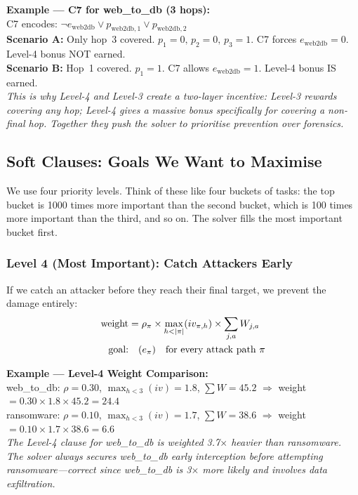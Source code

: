 \documentclass[journal]{IEEEtran}
\begin{document}
\begin{examplebox}
\textbf{Example --- C7 for web\_to\_db (3 hops):}\\[3pt]
C7 encodes:
$\neg e_{\text{web2db}} \vee p_{\text{web2db},1}
\vee p_{\text{web2db},2}$\\[3pt]
\textbf{Scenario A:} Only hop~3 covered.
$p_1=0,\,p_2=0,\,p_3=1$.
C7 forces $e_{\text{web2db}}=0$.
Level-4 bonus NOT earned.\\
\textbf{Scenario B:} Hop~1 covered.
$p_1=1$.
C7 allows $e_{\text{web2db}}=1$.
Level-4 bonus IS earned.\\[3pt]
\textit{This is why Level-4 and Level-3 create a two-layer
incentive: Level-3 rewards covering any hop; Level-4 gives
a massive bonus specifically for covering a non-final hop.
Together they push the solver to prioritise prevention over
forensics.}
\end{examplebox}

\subsection{Soft Clauses: Goals We Want to Maximise}

We use four priority levels.
Think of these like four buckets of tasks:
the top bucket is 1000 times more important than the second
bucket, which is 100 times more important than the third,
and so on.
The solver fills the most important bucket first.

\subsubsection{Level 4 (Most Important): Catch Attackers Early}

If we catch an attacker before they reach their final target,
we prevent the damage entirely:
\begin{align}
  \text{weight} &= \rho_\pi \times
    \max_{h < |\pi|}(iv_{\pi,h}) \times
    \sum_{j,a} W_{j,a} \notag \\
  \text{goal:} &\quad (e_\pi)
    \quad \text{for every attack path } \pi
\end{align}

\begin{examplebox}
\textbf{Example --- Level-4 Weight Comparison:}\\[3pt]
web\_to\_db: $\rho=0.30$, $\max_{h<3}(iv)=1.8$,
$\sum W=45.2$
$\Rightarrow$ weight $=0.30\times1.8\times45.2=\mathbf{24.4}$\\
ransomware: $\rho=0.10$, $\max_{h<3}(iv)=1.7$,
$\sum W=38.6$
$\Rightarrow$ weight $=0.10\times1.7\times38.6=\mathbf{6.6}$\\[3pt]
\textit{The Level-4 clause for web\_to\_db is weighted
3.7$\times$ heavier than ransomware.
The solver always secures web\_to\_db early interception
before attempting ransomware---correct since web\_to\_db
is 3$\times$ more likely and involves data exfiltration.}
\end{examplebox}
\end{document}
